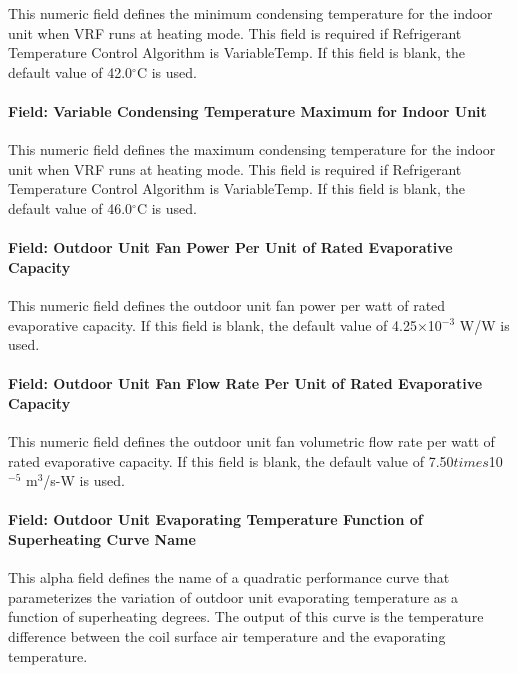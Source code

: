 This numeric field defines the minimum condensing temperature for the indoor unit when VRF runs at heating mode. This field is required if Refrigerant Temperature Control Algorithm is VariableTemp. If this field is blank, the default value of 42.0$^\circ$C is used.

\paragraph{Field: Variable Condensing Temperature Maximum for Indoor Unit}\label{field-variable-condensing-temperature-maximum-for-indoor-unit}

This numeric field defines the maximum condensing temperature for the indoor unit when VRF runs at heating mode. This field is required if Refrigerant Temperature Control Algorithm is VariableTemp. If this field is blank, the default value of 46.0$^\circ$C is used.

\paragraph{Field: Outdoor Unit Fan Power Per Unit of Rated Evaporative Capacity}\label{field-outdoor-unit-fan-power-per-unit-of-rated-evaporative-capacity}

This numeric field defines the outdoor unit fan power per watt of rated evaporative capacity. If this field is blank, the default value of 4.25$\times$10$^{-3}$ W/W is used.

\paragraph{Field: Outdoor Unit Fan Flow Rate Per Unit of Rated Evaporative Capacity}\label{field-outdoor-unit-fan-flow-rate-per-unit-of-rated-evaporative-capacity}

This numeric field defines the outdoor unit fan volumetric flow rate per watt of rated evaporative capacity. If this field is blank, the default value of 7.50$times$10$^{-5}$ m\(^{3}\)/s-W is used.

\paragraph{Field: Outdoor Unit Evaporating Temperature Function of Superheating Curve Name}\label{field-outdoor-unit-evaporating-temperature-function-of-superheating-curve-name}

This alpha field defines the name of a quadratic performance curve that parameterizes the variation of outdoor unit evaporating temperature as a function of superheating degrees. The output of this curve is the temperature difference between the coil surface air temperature and the evaporating temperature.


